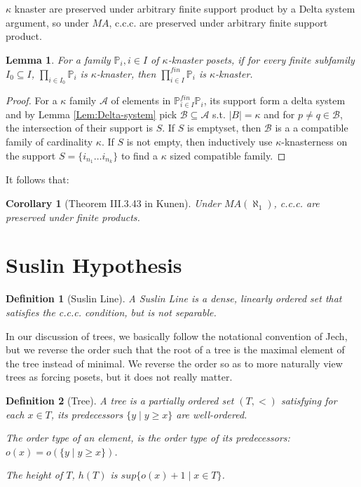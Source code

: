 \documentclass{article}
\newtheorem{definition}{Definition}
\newtheorem{lemma}{Lemma}
\newtheorem{corollary}{Corollary}
\newcommand{\bbP}{\mathbb{P}}
\begin{document}
$\kappa$ knaster are preserved under arbitrary finite support product by a Delta system argument, so under $MA$, c.c.c. are preserved under arbitrary finite support product.

\begin{lemma}
    For a family $\bbP_i,i\in I$ of $\kappa$-knaster posets, if for every finite subfamily $I_0\subseteq I$, $\prod_{i\in I_0}\bbP_i$ is $\kappa$-knaster, then $\prod^{fin}_{i\in I}\bbP_i$ is $\kappa$-knaster. 
\end{lemma}

\begin{proof}
    For a $\kappa$ family $\mathcal{A}$ of elements in $\bbP^{fin}_{i\in I}\bbP_i$, its support form a delta system and by Lemma \ref{Lem:Delta-system} pick $\mathcal{B}\subseteq \mathcal{A} $ s.t. $|B| = \kappa$ and for $p\neq q\in \mathcal{B}$, the intersection of their support is $S$. If $S$ is emptyset, then $\mathcal{B}$ is a a compatible family of cardinality $\kappa$. If $S$ is not empty, then inductively use $\kappa$-knasterness on the support $S = \{i_{n_1}\dots i_{n_k}\}$ to find a $\kappa$ sized compatible family. 
\end{proof}

It follows that:

\begin{corollary}[Theorem III.3.43 in Kunen]
    Under $MA(\aleph_1)$, c.c.c. are preserved under finite products.
\end{corollary}

\section{Suslin Hypothesis}

\begin{definition}[Suslin Line]
    A Suslin Line is a dense, linearly ordered set that satisfies the c.c.c. condition, but is not separable.
\end{definition}

In our discussion of trees, we basically follow the notational convention of Jech, but we reverse the order such that the root of a tree is the maximal element of the tree instead of minimal. We reverse the order so as to more naturally view trees as forcing posets, but it does not really matter.

\begin{definition}[Tree]
    A tree is a partially ordered set $(T,<)$ satisfying for each $x\in T$, its predecessors $\{y\mid y\geq x\}$ are well-ordered.

    The order type of an element, is the order type of its predecessors: $o(x) = o(\{y\mid y\geq x\})$.

    The height of $T$, $h(T)$ is $sup\{o(x)+1\mid x\in T\}$.
\end{definition}
\end{document}
